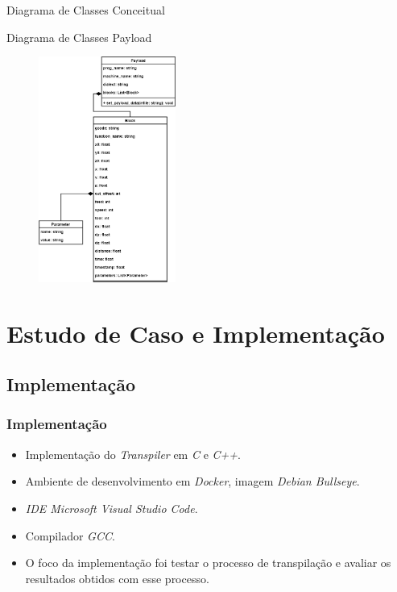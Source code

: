 \documentclass[aspectratio=169]{beamer}
\begin{document}
{\begin{frame}{Diagrama de Classes Conceitual}
\end{frame}


\begin{frame}{Diagrama de Classes Payload}

  \begin{figure}[H]
    \centering
    \includegraphics[width=45mm]{images/class-payload.png}
  \end{figure}

\end{frame}


\section{Estudo de Caso e Implementação}

\subsection{Implementação}

\begin{frame}
  \frametitle{Implementação}

  \begin{itemize}
    \item Implementação do \emph{Transpiler} em \emph{C} e \emph{C++}.
    \item Ambiente de desenvolvimento em \emph{Docker}, 
          imagem \emph{Debian Bullseye}.
    \item \emph{IDE Microsoft Visual Studio Code}.
    \item Compilador \emph{GCC}.
    \item O foco da implementação foi testar o processo de transpilação 
          e avaliar os resultados obtidos com esse processo.
  \end{itemize}

\end{frame}


}
\end{document}
